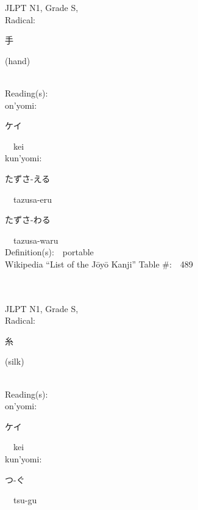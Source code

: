 \begin{multicols}{2}
{JLPT N1, Grade S, \\Radical:\ \ {\begin{CJK}{UTF8}{min} 手 \end{CJK}} (hand) } \\
Reading(s):\ \ \\
{\hspace*{1em}}on'yomi:\ \ \\
{\hspace*{2em}}{\begin{CJK}{UTF8}{min} ケイ \end{CJK}}\ \ kei\ \ \\
{\hspace*{1em}}kun'yomi:\ \ \\
{\hspace*{2em}}{\begin{CJK}{UTF8}{min} たずさ-える \end{CJK}}\ \ tazusa-eru\ \ \\
{\hspace*{2em}}{\begin{CJK}{UTF8}{min} たずさ-わる \end{CJK}}\ \ tazusa-waru\ \ \\
Definition(s):\ \ portable \\
Wikipedia ``List of the J\=oy\=o Kanji'' Table \#:\ \ 489 \\
\ \ \\
{\fontsize{34pt}{40pt}  }\ \ \\
{JLPT N1, Grade S, \\Radical:\ \ {\begin{CJK}{UTF8}{min} 糸 \end{CJK}} (silk) } \\
Reading(s):\ \ \\
{\hspace*{1em}}on'yomi:\ \ \\
{\hspace*{2em}}{\begin{CJK}{UTF8}{min} ケイ \end{CJK}}\ \ kei\ \ \\
{\hspace*{1em}}kun'yomi:\ \ \\
{\hspace*{2em}}{\begin{CJK}{UTF8}{min} つ-ぐ \end{CJK}}\ \ tsu-gu\ \ \\

\end{multicols}
